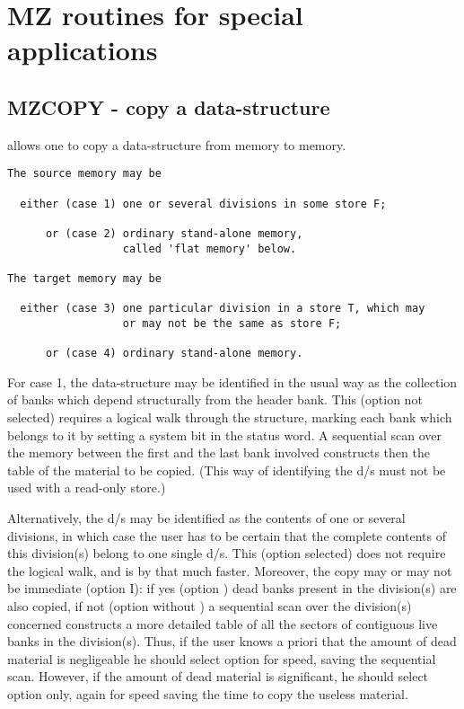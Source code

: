 \chapter{MZ routines for special applications}
\label{sec:H1-MZ-routines-for-special-applications}

\section{MZCOPY - copy a data-structure}

 allows one to copy a data-structure from memory to memory.
\begin{verbatim}
The source memory may be

  either (case 1) one or several divisions in some store F;

      or (case 2) ordinary stand-alone memory,
                  called 'flat memory' below.

The target memory may be

  either (case 3) one particular division in a store T, which may
                  or may not be the same as store F;

      or (case 4) ordinary stand-alone memory.
\end{verbatim} 

For case 1, the data-structure may be identified in the usual way
as the collection of banks which depend structurally
from the header bank.
This (option  not selected) requires a logical walk through
the structure,
marking each bank which belongs to it by setting a system bit
in the status word.
A sequential scan over the memory between the first and the last bank
involved constructs then the table of the material to be copied.
(This way of identifying the d/s must not be used with
a read-only store.)

Alternatively, the d/s may be identified as the contents
of one or several divisions,
in which case the user has to be certain that the complete contents
of this division(s) belong to one single d/s.
This (option  selected) does not require the logical walk,
and is by that much faster.
Moreover, the copy may or may not be immediate (option I):
if yes (option ) dead banks present in the division(s) are
also copied, if not (option  without ) a sequential scan
over the division(s) concerned constructs a more detailed
table of all the sectors of contiguous live banks in the division(s).
Thus, if the user knows a priori that the amount of dead material
is negligeable he should select option  for speed,
saving the sequential scan.
However, if the amount of dead material is significant,
he should select option  only,
again for speed saving the time to copy the useless material.

